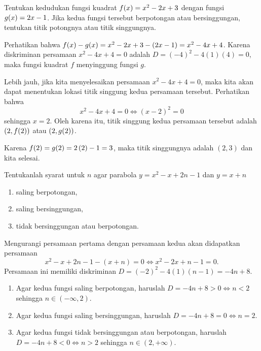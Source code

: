 		\begin{contoh}
			Tentukan kedudukan fungsi kuadrat $ \mathop{}\!{f}{\left({x}\right)} = x^{2} - 2x + 3 $ dengan fungsi $ \mathop{}\!{g}{\left({x}\right)} = 2x - 1 $. Jika kedua fungsi tersebut berpotongan atau bersinggungan, tentukan titik potongnya atau titik singgungnya.
		\end{contoh}
		\begin{jawab}
			Perhatikan bahwa $ \mathop{}\!{f}{\left({x}\right)} - \mathop{}\!{g}{\left({x}\right)} = x^{2} - 2x + 3 - \left(2x - 1\right) = x^{2} - 4x + 4 $. Karena diskriminan persamaan $ x^{2} - 4x + 4 = 0 $ adalah $ D = \left(-4\right)^{2} - 4\left(1\right)\left(4\right) = 0 $, maka fungsi kuadrat $ f $ menyinggung fungsi $ g $.
			\par Lebih jauh, jika kita menyelesaikan persamaan $ x^{2} - 4x + 4 = 0 $, maka kita akan dapat menentukan lokasi titik singgung kedua persamaan tersebut. Perhatikan bahwa
			\[ x^{2} - 4x + 4 = 0 \iff \left(x - 2\right)^{2} = 0 \]
			sehingga $ x = 2 $. Oleh karena itu, titik singgung kedua persamaan tersebut adalah $ \left(2, \mathop{}\!{f}{\left({2}\right)}\right) $ atau $ \left(2, \mathop{}\!{g}{\left({2}\right)}\right) $.
			\par Karena $ \mathop{}\!{f}{\left({2}\right)} = \mathop{}\!{g}{\left({2}\right)} = 2\left(2\right) - 1 = 3 $, maka titik singgungnya adalah $ \left(2, 3\right) $ dan kita selesai.
		\end{jawab}
		
		\begin{contoh}
			Tentukanlah syarat untuk $ n $ agar parabola $ y = x^{2} - x + 2n - 1 $ dan $ y = x + n $
			\begin{enumerate}
				\item saling berpotongan,
				\item saling bersinggungan,
				\item tidak bersinggungan atau berpotongan.
			\end{enumerate}
		\end{contoh}
		\begin{jawab}
			Mengurangi persamaan pertama dengan persamaan kedua akan didapatkan persamaan
			\[ x^{2} - x + 2n - 1 - \left(x + n\right) = 0 \iff x^{2} - 2x + n - 1 = 0. \]
			Persamaan ini memiliki diskriminan $ D = \left(-2\right)^{2} - 4\left(1\right)\left(n - 1\right) = -4n + 8 $.
			\begin{enumerate}
				\item Agar kedua fungsi saling berpotongan, haruslah $ D = -4n + 8 > 0 \iff n < 2 $ sehingga $ n \in \left(-\infty, 2\right) $.
				\item Agar kedua fungsi saling bersinggungan, haruslah $ D = -4n + 8 = 0 \iff n = 2 $.
				\item Agar kedua fungsi tidak bersinggungan atau berpotongan, haruslah $ D = -4n + 8 < 0 \iff n > 2 $ sehingga $ n \in \left(2, +\infty\right) $.
			\end{enumerate}
		\end{jawab}
		
